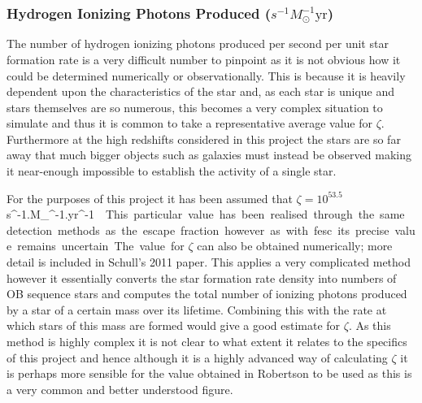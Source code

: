 		\subsubsection{Hydrogen Ionizing Photons Produced ($s^{-1}M_\odot^{-1}\text{yr}$)} %
		\label{sub:hydrogen_ionizing_photons_produced_per_second_per_unit_star_formation_rate}
			The number of hydrogen ionizing photons produced per second per unit star formation rate is a very difficult number to pinpoint as it is not obvious how it could be determined numerically or observationally. This is because it is heavily dependent upon the characteristics of the star and, as each star is unique and stars themselves are so numerous, this becomes a very complex situation to simulate and thus it is common to take a representative average value for $\zeta$. Furthermore at the high redshifts considered in this project the stars are so far away that much bigger objects such as galaxies must instead be observed making it near-enough impossible to establish the activity of a single star.

			For the purposes of this project it has been assumed that $\zeta=10^{53.5}$\si{s^{-1}.M_{\odot}^{-1}.yr^{-1}}\cite{robertson2010early}. This particular value has been realised through the same detection methods as the escape fraction however as with fesc its precise value remains uncertain.

			The value for $\zeta$ can also be obtained numerically; more detail is included in Schull’s 2011 paper\cite{shull2012critical}. This applies a very complicated method however it essentially converts the star formation rate density into numbers of OB sequence stars and computes the total number of ionizing photons produced by a star of a certain mass over its lifetime. Combining this with the rate at which stars of this mass are formed would give a good estimate for $\zeta$. As this method is highly complex it is not clear to what extent it relates to the specifics of this project and hence although it is a highly advanced way of calculating $\zeta$ it is perhaps more sensible for the value obtained in Robertson to be used as this is a very common and better understood figure.

